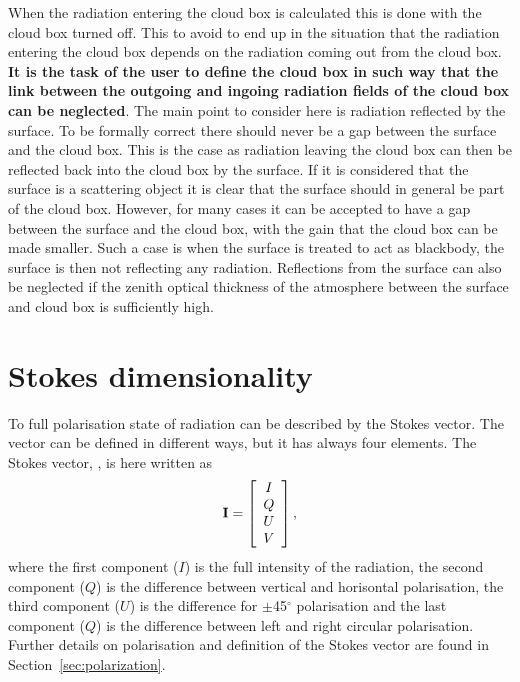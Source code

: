 When the radiation entering the cloud box is calculated this is done
with the cloud box turned off. This to avoid to end up in the
situation that the radiation entering the cloud box depends on the
radiation coming out from the cloud box. {\bf It is the task of the
  user to define the cloud box in such way that the link between the
  outgoing and ingoing radiation fields of the cloud box can be
  neglected}. The main point to consider here is radiation reflected
by the surface. To be formally correct there should never be a gap
between the surface and the cloud box. This is the case as radiation
leaving the cloud box can then be reflected back into the cloud box by
the surface. If it is considered that the surface is a scattering object
it is clear that the surface should in general be part of the cloud
box. However, for many cases it can be accepted to have a gap between
the surface and the cloud box, with the gain that the cloud box can be
made smaller. Such a case is when the surface is treated to act as
blackbody, the surface is then not reflecting any radiation.
Reflections from the surface can also be neglected if the zenith
optical thickness of the atmosphere between the surface and cloud box
is sufficiently high.



\section{Stokes dimensionality}
\label{sec:fm_defs:polarisation}

To full polarisation state of radiation can be described by the Stokes
vector. The vector can be defined in different ways, but it has always
four elements. The Stokes vector, \StoVec, is here written as
\begin{equation}
  \label{eq:fm_defs:stokevec}
  {\bf I} = \left[
  \begin{array}{c}
   I\\Q\\U\\V
  \end{array}
  \right],
\end{equation}
where the first component ($I$) is the full intensity of the
radiation, the second component ($Q$) is the difference between
vertical and horisontal polarisation, the third component ($U$) is the
difference for $\pm$45$^\circ$ polarisation and the last component
($Q$) is the difference between left and right circular polarisation.
Further details on polarisation and definition of the Stokes vector
are found in Section~\ref{sec:polarization}.


